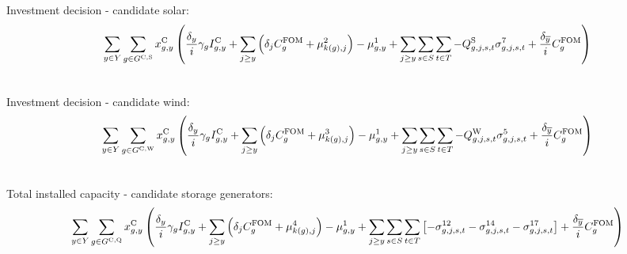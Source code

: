 \documentclass{article}
\begin{document}
Investment decision - candidate solar:
\begin{align}
& \sum\limits_{\iYear \in \sYears} \sum\limits_{\iGenerator \in \sGeneratorsCandidateSolar} \vInstalledCapacity \left(\frac{\cDiscountRate}{\cInterestRate} \cAmortisationRate \cCandidateInvestmentCost + \sum\limits_{\iYearAlias \geq \iYear} \left(\cDiscountRate[\iYearAlias] \cFixedOperationsMaintenanceCostGenerator + \dSolarBuildLimit[k(\iGenerator), \iYearAlias] \right) - \dNonNegativeCandidateCapacity 
+ \sum\limits_{\iYearAlias \geq \iYear} \sum\limits_{\iScenario \in \sScenarios} \sum\limits_{\iInterval \in \sIntervals} - \cCapacityFactorSolar[\iGenerator,\iYearAlias,\iScenario,\iInterval] \dMaxPowerOutputSolarCandidate[\iGenerator,\iYearAlias,\iScenario,\iInterval] + \frac{\cDiscountRate[\iYearTerminal]}{\cInterestRate}\cFixedOperationsMaintenanceCostGenerator\right)\\\nonumber
\end{align}

Investment decision - candidate wind:
\begin{align}
& \sum\limits_{\iYear \in \sYears} \sum\limits_{\iGenerator \in \sGeneratorsCandidateWind} \vInstalledCapacity \left(\frac{\cDiscountRate}{\cInterestRate} \cAmortisationRate \cCandidateInvestmentCost + \sum\limits_{\iYearAlias \geq \iYear} \left(\cDiscountRate[\iYearAlias] \cFixedOperationsMaintenanceCostGenerator + \dWindBuildLimit[k(\iGenerator), \iYearAlias] \right) - \dNonNegativeCandidateCapacity 
+ \sum\limits_{\iYearAlias \geq \iYear} \sum\limits_{\iScenario \in \sScenarios} \sum\limits_{\iInterval \in \sIntervals} - \cCapacityFactorWind[\iGenerator,\iYearAlias,\iScenario,\iInterval] \dMaxPowerOutputWindCandidate[\iGenerator,\iYearAlias,\iScenario,\iInterval] + \frac{\cDiscountRate[\iYearTerminal]}{\cInterestRate}\cFixedOperationsMaintenanceCostGenerator \right)\\\nonumber
\end{align}

Total installed capacity - candidate storage generators:
\begin{align}
& \sum\limits_{\iYear \in \sYears} \sum\limits_{\iGenerator \in \sStorageCandidate} \vInstalledCapacity \left(\frac{\cDiscountRate}{\cInterestRate} \cAmortisationRate \cCandidateInvestmentCost + \sum\limits_{\iYearAlias \geq \iYear}\left(\cDiscountRate[\iYearAlias] \cFixedOperationsMaintenanceCostGenerator + \dStorageBuildLimit[k(\iGenerator),\iYearAlias] \right) - \dNonNegativeCandidateCapacity + \sum\limits_{\iYearAlias \geq \iYear} \sum\limits_{\iScenario \in \sScenarios} \sum\limits_{\iInterval \in \sIntervals} \left[- \dMaxChargingRateCandidate[\iGenerator,\iYearAlias,\iScenario,\iInterval] - \dMaxDischargingRateCandidate[\iGenerator,\iYearAlias,\iScenario,\iInterval] - \dMaxStorageEnergyCandidate[\iGenerator,\iYearAlias,\iScenario,\iInterval] \right] + \frac{\cDiscountRate[\iYearTerminal]}{\cInterestRate}\cFixedOperationsMaintenanceCostGenerator\right)\\\nonumber
\end{align}
\end{document}
